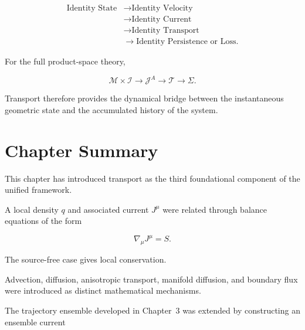 \documentclass[12pt,oneside]{book}
\begin{document}
\begin{equation}
\boxed{
\begin{aligned}
    \text{Identity State}
    &\longrightarrow
    \text{Identity Velocity}
    \\
    &\longrightarrow
    \text{Identity Current}
    \\
    &\longrightarrow
    \text{Identity Transport}
    \\
    &\longrightarrow
    \text{Identity Persistence or Loss}.
\end{aligned}
}
\label{eq:identity-transport-architecture}
\end{equation}

For the full product-space theory,

\begin{equation}
\boxed{
    \mathcal{M}
    \times
    \mathcal{I}
    \longrightarrow
    \mathcal{J}^A
    \longrightarrow
    \mathcal{T}
    \longrightarrow
    \Sigma
}.
\label{eq:product-transport-architecture}
\end{equation}

Transport therefore provides the dynamical bridge between the
instantaneous geometric state and the accumulated history of
the system.


\section{Chapter Summary}
\label{sec:transport-chapter-summary}

This chapter has introduced transport as the third foundational
component of the unified framework.

A local density \(q\) and associated current \(J^\mu\) were
related through balance equations of the form

\begin{equation}
    \nabla_\mu J^\mu
    =
    S.
\end{equation}

The source-free case gives local conservation.

Advection, diffusion, anisotropic transport, manifold diffusion,
and boundary flux were introduced as distinct mathematical
mechanisms.

The trajectory ensemble developed in Chapter~3 was extended by
constructing an ensemble current
\end{document}
